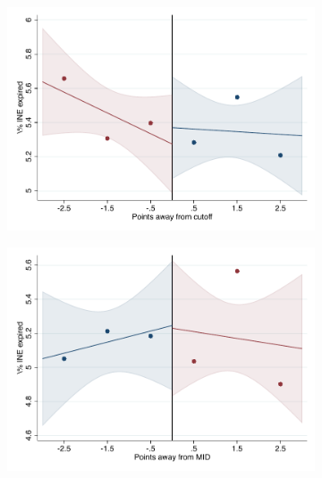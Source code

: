 \documentclass[oneside,11pt]{article}
\begin{document}
\begin{figure}[H]
\begin{center}
    \begin{subfigure}{0.475\textwidth}
        \centering
        \includegraphics[width=\textwidth]{04_Figures/rd_plot_tau_Expired_INE_UNAM3.pdf}
    \end{subfigure}
    \begin{subfigure}{0.475\textwidth}
        \centering
        \includegraphics[width=\textwidth]{04_Figures/rd_plot_mid_Expired_INE_UNAM3.pdf}
    \end{subfigure}


\end{center}
\end{figure}
\end{document}
